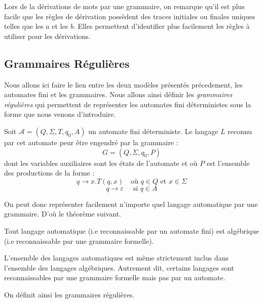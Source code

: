 \begin{remark}
    Lors de la dérivations de mots par une grammaire, on remarque qu'il est plus facile que les règles de dérivation 
    possèdent des traces initiales ou finales uniques telles que les $a$ et les $b$. 
    Elles permettent d'identifier plus facilement les règles à utiliser pour les dérivations. 
\end{remark}


\subsection{Grammaires Régulières}

Nous allons ici faire le lien entre les deux modèles présentés précedement, les automates fini et les grammaires. 
Nous allons ainsi définir les \emph{grammaires régulières} qui permettent de représenter les automates fini déterministes sous 
la forme que nous venons d'introduire. 

\begin{prop}
    Soit $ \mathcal{A} = (Q, \Sigma, T, q_0, A)$ un automate fini déterministe. 
    Le langage $L$ reconnu par cet automate peur être engendré par la grammaire : 
        \[ G = (Q, \Sigma, q_0, P) \] 
    dont les variables auxiliaires sont les états de l'automate et où $P$ est l'ensemble 
    des productions de la forme :
        \[ q \longrightarrow x. T(q,x) \quad \text{où } q \in Q \text{ et } x \in \Sigma \] 
        \[ q \longrightarrow \varepsilon \quad \text{ si } q \in A \] 
\end{prop}

On peut donc représenter facilement n'importe quel langage automatique par une grammaire. 
D'où le théorème suivant. 

\begin{theorem}
    Tout langage automatique (i.e reconnaissable par un automate fini) est algébrique (i.e reconnaissable par une grammaire formelle). 
    
    \vspace{0.2cm}

    L'ensemble des langages automatiques est même strictement inclus dans l'ensemble des langages algébriques. 
    Autrement dit, certains langages sont reconnaissables par une grammaire formelle mais pas par un automate. 
\end{theorem}

On définit ainsi les grammaires régulières. 

